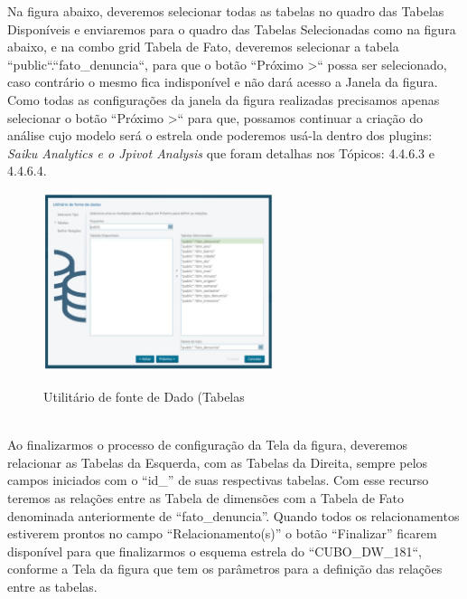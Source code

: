 Na figura abaixo, deveremos selecionar todas as tabelas no quadro das Tabelas Dispon\'{i}veis e enviaremos para o quadro das Tabelas Selecionadas como na 
figura abaixo, e na combo grid Tabela de Fato, deveremos selecionar a tabela ``public``.``fato_denuncia``, para que o bot\~{a}o ``Pr\'{o}ximo >`` possa ser 
selecionado, caso contr\'{a}rio o mesmo fica indispon\'{i}vel e n\~{a}o dar\'{a} acesso a Janela da figura. Como todas as configura\c{c}\~{o}es da janela da 
figura  realizadas precisamos apenas selecionar o bot\~{a}o ``Pr\'{o}ximo >`` para que, possamos continuar a cria\c{c}\~{a}o do an\'{a}lise cujo modelo ser\'{a} 
o estrela onde poderemos us\'{a}-la dentro dos plugins: \textit{Saiku Analytics e o Jpivot Analysis} que foram detalhas nos T\'{o}picos: 4.4.6.3 e 4.4.6.4. 

\begin{figure}[H]
	\vspace*{0,2cm}
    \centering
    \caption{Utilit\'{a}rio de fonte de Dado (Tabelas}
    \includegraphics[width=0.6\textwidth]{./04-figuras/figura-puc-utiliario-fonte-de-dados-tabelas}
    \label{fig:ilustfigpucutiliariofontededadostabelas}
\end{figure}
\vspace*{-0,9cm}
{\raggedright {}} \\

Ao finalizarmos o processo de configura\c{c}\~{a}o da Tela da figura, deveremos relacionar as Tabelas da Esquerda, com as Tabelas da Direita, 
sempre pelos campos iniciados com o ``id\_'' de suas respectivas tabelas. Com esse recurso teremos as rela\c{c}\~{o}es entre as Tabela de dimens\~{o}es 
com a Tabela de Fato denominada anteriormente de ``fato_denuncia''. Quando todos os relacionamentos estiverem prontos no campo ``Relacionamento(s)'' 
o bot\~{a}o ``Finalizar'' ficarem dispon\'{i}vel para que finalizarmos o esquema estrela do ``CUBO\_DW\_181``, conforme a Tela da figura que tem os 
par\^{a}metros para a defini\c{c}\~{a}o das rela\c{c}\~{o}es entre as tabelas.

